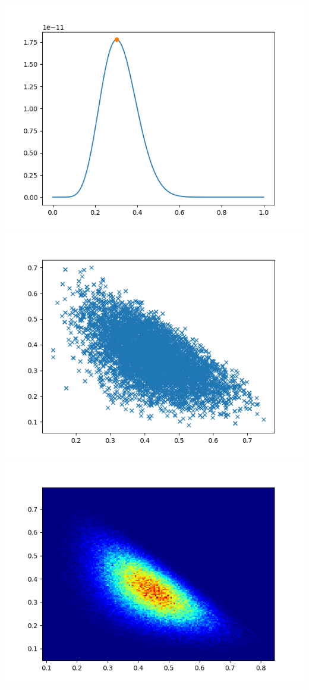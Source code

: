 \documentclass[pt12]{article}
\begin{document}
\newpage

\begin{center}
\includegraphics[scale=0.5]{hip36.png}\\
\includegraphics[scale=0.5]{sc36.png}\\
\includegraphics[scale=0.5]{den36.png}\\
\end{center}
\end{document}
